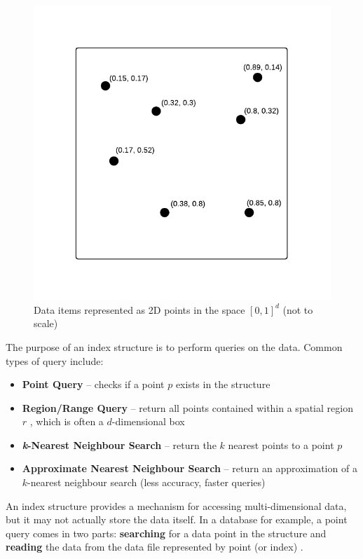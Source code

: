 \begin{figure}
	\vspace{-40pt}
	\begin{center}
		\includegraphics[scale=0.6]{figures/2D_data_space.pdf}
	\end{center}
	\vspace{-40pt}
	\caption{Data items represented as 2D points in the space $[0, 1]^d$ (not to scale)}
	\label{fig:data-space}
\end{figure}

The purpose of an index structure is to perform queries on the data. Common types of query include:
\begin{itemize}
	\item \textbf{Point Query} -- checks if a point $p$ exists in the structure \cite{rplus-tree}
	\item \textbf{Region/Range Query} -- return all points contained within a spatial region $r$ \cite{rplus-tree}, which is often a $d$-dimensional box \cite{r-tree, pk-tree, pyramid-tree}
	\item \textbf{\textit{k}-Nearest Neighbour Search} -- return the $k$ nearest points to a point $p$ \cite{pk-tree}
	\item \textbf{Approximate Nearest Neighbour Search} -- return an approximation of a $k$-nearest neighbour search \cite{knn-curse-of-dimensionality} (less accuracy, faster queries)
\end{itemize}

An index structure provides a mechanism for accessing multi-dimensional data, but it may not actually store the data itself. In a database for example, a point query comes in two parts: \textbf{searching} for a data point in the structure and \textbf{reading} the data from the data file represented by point (or index) \cite{rsr-tree}.
